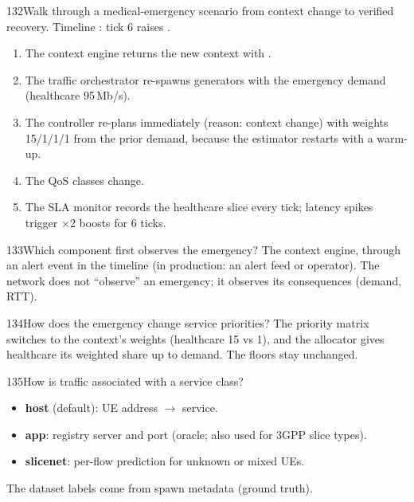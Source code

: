 \begin{qa}{132}{Walk through a medical-emergency scenario from context change to verified recovery.}
Timeline : tick 6 raises .
\begin{enumerate}
\item The context engine returns the new context with .
\item The traffic orchestrator re-spawns generators with the emergency demand (healthcare 95\,Mb/s).
\item The controller re-plans immediately (reason: context change) with weights 15/1/1/1 from the prior demand,
because the estimator restarts with a warm-up.
\item The QoS classes change.
\item The SLA monitor records the healthcare slice every tick; latency spikes trigger $\times$2 boosts for 6 ticks.
\end{enumerate}
\end{qa}

\begin{qa}{133}{Which component first observes the emergency?}
The context engine, through an alert event in the timeline (in production: an alert feed or operator). The network
does not ``observe'' an emergency; it observes its consequences (demand, RTT).
\end{qa}

\begin{qa}{134}{How does the emergency change service priorities?}
The priority matrix switches to the context's weights (healthcare 15 vs 1), and the allocator gives healthcare its
weighted share up to demand. The floors stay unchanged.
\end{qa}

\begin{qa}{135}{How is traffic associated with a service class?}
\begin{itemize}
\item \textbf{host} (default): UE address $\to$ service.
\item \textbf{app}: registry server and port (oracle; also used for 3GPP slice types).
\item \textbf{slicenet}: per-flow prediction for unknown or mixed UEs.
\end{itemize}
The dataset labels come from spawn metadata (ground truth).
\end{qa}

